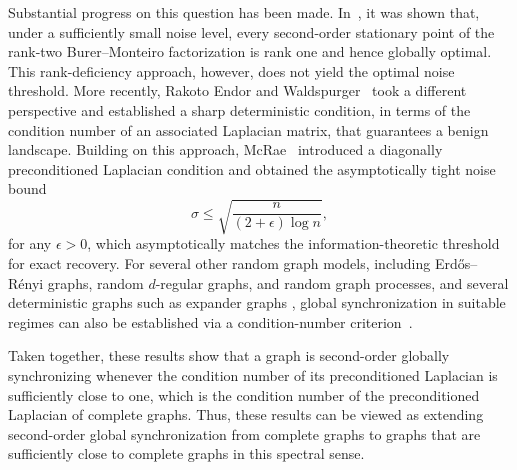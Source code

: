 \documentclass[11pt,reqno]{amsart}
\theoremstyle{definition}
\begin{document}
Substantial progress on this question has been made. In~\cite{bandeira2016low}, it was shown that, under a sufficiently small noise level, every second-order stationary point of the rank-two Burer--Monteiro factorization is rank one and hence globally optimal. This rank-deficiency approach, however, does not yield the optimal noise threshold. More recently, Rakoto Endor and Waldspurger~\cite{endor2024benign} took a different perspective and established a sharp deterministic condition, in terms of the condition number of an associated Laplacian matrix, that guarantees a benign landscape. Building on this approach, McRae~\cite{mcrae2025benign} introduced a diagonally preconditioned Laplacian condition and obtained the asymptotically tight noise bound
\[
    \sigma \leq \sqrt{\frac{n}{(2+\epsilon)\log n}},
\]
for any $\epsilon>0$, which asymptotically matches the information-theoretic threshold for exact recovery. For several other random graph models, including Erd\H{o}s--R\'enyi graphs, random $d$-regular graphs, and random graph processes, and several deterministic graphs such as expander graphs \cite{abdalla2026expander}, global synchronization in suitable regimes can also be established via a condition-number criterion~\cite{mcrae2025benign}.

Taken together, these results show that a graph is second-order globally synchronizing whenever the condition number of its preconditioned Laplacian is sufficiently close to one, which is the condition number of the preconditioned Laplacian of complete graphs. Thus, these results can be viewed as extending second-order global synchronization from complete graphs to graphs that are sufficiently close to complete graphs in this spectral sense.
\newline
\end{document}
